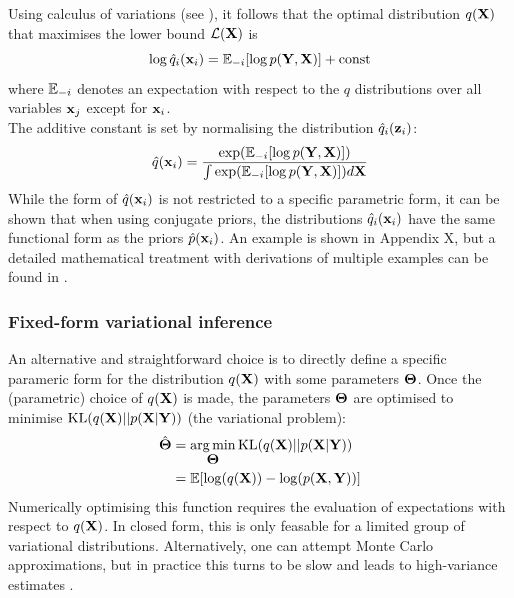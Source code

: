 Using calculus of variations (see \cite{Bishop,Murphy}), it follows that the optimal distribution $q({\bf X})$ that maximises the lower bound $\mathcal{L}({\bf X})$ is
\begin{equation} \label{eq:optimal}
	\log \hat{q}_i({\bf x}_i) = \mathbb{E}_{-i} [\log p({\bf Y},{\bf X})] + \mathrm{const}
\end{equation}
where $\mathbb{E}_{-i}$ denotes an expectation with respect to the $q$ distributions over all variables ${\bf x}_j$ except for ${\bf x}_i$.\\
The additive constant is set by normalising the distribution $\hat{q}_i({\bf z}_i)$:
\[
	\hat{q}({\bf x}_i) = \frac{\exp(\mathbb{E}_{-i}[\log p({\bf Y},{\bf X})])}{\int \exp(\mathbb{E}_{-i}[\log p({\bf Y},{\bf X})]) d{\bf X}}
\]
While the form of $\hat{q}({\bf x}_i)$ is not restricted to a specific parametric form, it can be shown that when using conjugate priors, the distributions $\hat{q}_i({\bf x}_i)$ have the same functional form as the priors $\hat{p}({\bf x}_i)$. An example is shown in Appendix X, but a detailed mathematical treatment with derivations of multiple examples can be found in \cite{Bishop,Murphy,Zhao2009}.


\subsubsection{Fixed-form variational inference}  \label{section:fixed_form}
An alternative and straightforward choice is to directly define a specific parameric form for the distribution $q({\bf X})$ with some parameters $\mbox{\boldmath $\Theta$}$. Once the (parametric) choice of $q({\bf X})$ is made, the parameters $\mbox{\boldmath $\Theta$}$ are optimised to minimise ${\rm KL}(q({\bf X})||p({\bf X}|{\bf Y}))$ (the variational problem):
\begin{align}
	\hat{\mbox{\boldmath $\Theta$}} &= \operatorname*{arg\,min}_{\mbox{\boldmath $\Theta$}} {\rm KL}(q({\bf X})||p({\bf X}|{\bf Y})) \\
	&= \mathbb{E}[\log(q({\bf X})) - \log(p({\bf X},{\bf Y}))]
\end{align}
Numerically optimising this function requires the evaluation of expectations with respect to $q({\bf X})$. In closed form, this is only feasable for a limited group of variational distributions. Alternatively, one can attempt Monte Carlo approximations, but in practice this turns to be slow and leads to high-variance estimates \cite{XX}.

